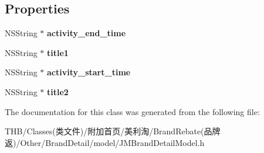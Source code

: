 \subsection*{Properties}
\begin{DoxyCompactItemize}
\item 
\mbox{\label{interface_j_m_brand_detail_time_model_a438559ed1f987331ba7d06227847e9b5}} 
N\+S\+String $\ast$ {\bfseries activity\+\_\+end\+\_\+time}
\item 
\mbox{\label{interface_j_m_brand_detail_time_model_a09488fa23ee24f4a834cf152e7c40720}} 
N\+S\+String $\ast$ {\bfseries title1}
\item 
\mbox{\label{interface_j_m_brand_detail_time_model_a09c5f06dc010a680ff406a9178c43d47}} 
N\+S\+String $\ast$ {\bfseries activity\+\_\+start\+\_\+time}
\item 
\mbox{\label{interface_j_m_brand_detail_time_model_aef3ca4b93d8b8b20c54e2e2d4ea7b662}} 
N\+S\+String $\ast$ {\bfseries title2}
\end{DoxyCompactItemize}


The documentation for this class was generated from the following file\+:\begin{DoxyCompactItemize}
\item 
T\+H\+B/\+Classes(类文件)/附加首页/美利淘/\+Brand\+Rebate(品牌返)/\+Other/\+Brand\+Detail/model/J\+M\+Brand\+Detail\+Model.\+h\end{DoxyCompactItemize}
